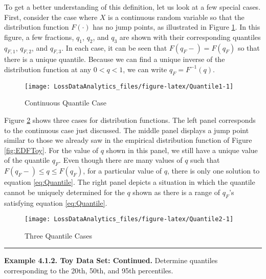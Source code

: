 \documentclass[]{book}
\theoremstyle{definition}
\theoremstyle{definition}
\theoremstyle{definition}
\theoremstyle{remark}
\begin{document}
To get a better understanding of this definition, let us look at a few
special cases. First, consider the case where \(X\) is a continuous
random variable so that the distribution function \(F(\cdot)\) has no
jump points, as illustrated in Figure \ref{fig:Quantile1}. In this
figure, a few fractions, \(q_1\), \(q_2\), and \(q_3\) are shown with
their corresponding quantiles \(q_{F,1}\), \(q_{F,2}\), and \(q_{F,3}\).
In each case, it can be seen that \(F(q_F-)= F(q_F)\) so that there is a
unique quantile. Because we can find a unique inverse of the
distribution function at any \(0<q<1\), we can write \(q_F= F^{-1}(q)\).

\begin{figure}

{\centering \texttt{[image: LossDataAnalytics\_files/figure-latex/Quantile1-1]} 

}

\caption{Continuous Quantile Case}\label{fig:Quantile1}
\end{figure}

Figure \ref{fig:Quantile2} shows three cases for distribution functions.
The left panel corresponds to the continuous case just discussed. The
middle panel displays a jump point similar to those we already saw in
the empirical distribution function of Figure \ref{fig:EDFToy}. For the
value of \(q\) shown in this panel, we still have a unique value of the
quantile \(q_F\). Even though there are many values of \(q\) such that
\(F(q_F-) \le q \le F(q_F)\), for a particular value of \(q\), there is
only one solution to equation \eqref{eq:Quantile}. The right panel depicts
a situation in which the quantile cannot be uniquely determined for the
\(q\) shown as there is a range of \(q_F\)'s satisfying equation
\eqref{eq:Quantile}.

\begin{figure}

{\centering \texttt{[image: LossDataAnalytics\_files/figure-latex/Quantile2-1]} 

}

\caption{Three Quantile Cases}\label{fig:Quantile2}
\end{figure}

\begin{center}\rule{0.5\linewidth}{\linethickness}\end{center}

\textbf{Example 4.1.2. Toy Data Set: Continued.} Determine quantiles
corresponding to the 20th, 50th, and 95th percentiles.
\end{document}
